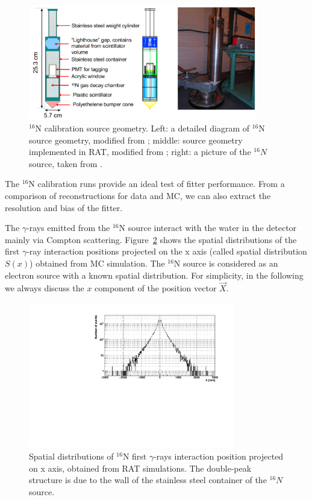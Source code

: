 \begin{figure}[!htb]
	\centering
	\includegraphics[width=10cm]{n16geom.png}
	\caption{$^{16}$N calibration source geometry. Left: a detailed diagram of $^{16}$N source geometry, modified from \cite{maclellan2009energy,matt_deployedsource}; middle: source geometry implemented in RAT, modified from \cite{n16geom_zach}; right: a picture of the $^{16}N$ source, taken from \cite{n16pic}.}
	\label{n16pic}
\end{figure}



The $^{16}$N calibration runs provide an ideal test of fitter performance. From a comparison of reconstructions for data and MC, we can also extract the resolution and bias of the fitter.



The $\gamma$-rays emitted from the $^{16}$N source interact with the water in the detector mainly via Compton scattering. Figure~\ref{hsx} shows the spatial distributions of the first $\gamma$-ray interaction positions projected on the x axis (called spatial distribution $S(x)$) obtained from MC simulation. The $^{16}$N source is considered as an electron source with a known spatial distribution\cite{boulay2004direct}. For simplicity, in the following we always discuss the $x$ component of the position vector $\vec{X}$. 






\begin{figure}[!htb]
	\centering
	\includegraphics[width=9cm]{sx.pdf}
	\caption{Spatial distributions of {$^{16}$}N first $\gamma$-rays interaction position projected on x axis, obtained from RAT simulations. The double-peak structure is due to the wall of the stainless steel container of the $^{16}N$ source.}
	\label{hsx}
\end{figure}


